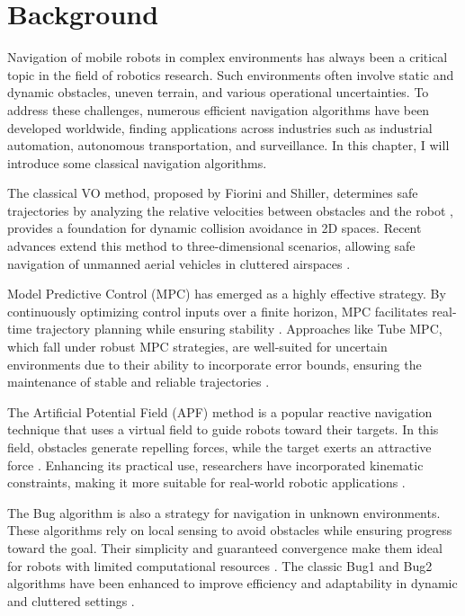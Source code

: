 \chapter{Background}
Navigation of mobile robots in complex environments has always been a critical topic in the field of robotics research. Such environments often involve static and dynamic obstacles, uneven terrain, and various operational uncertainties. To address these challenges, numerous efficient navigation algorithms have been developed worldwide, finding applications across industries such as industrial automation, autonomous transportation, and surveillance. In this chapter, I will introduce some classical navigation algorithms.

The classical VO method, proposed by Fiorini and Shiller, determines safe trajectories by analyzing the relative velocities between obstacles and the robot \cite{Fiorini1998}, provides a foundation for dynamic collision avoidance in 2D spaces. Recent advances extend this method to three-dimensional scenarios, allowing safe navigation of unmanned aerial vehicles in cluttered airspaces \cite{Bareiss2015}.

Model Predictive Control (MPC) has emerged as a highly effective strategy. By continuously optimizing control inputs over a finite horizon, MPC facilitates real-time trajectory planning while ensuring stability \cite{Mayne2014}. Approaches like Tube MPC, which fall under robust MPC strategies, are well-suited for uncertain environments due to their ability to incorporate error bounds, ensuring the maintenance of stable and reliable trajectories \cite{Mayne2014}.

The Artificial Potential Field (APF) method is a popular reactive navigation technique that uses a virtual field to guide robots toward their targets. In this field, obstacles generate repelling forces, while the target exerts an attractive force \cite{Kim2000}. Enhancing its practical use, researchers have incorporated kinematic constraints, making it more suitable for real-world robotic applications \cite{Ge2000}.

The Bug algorithm is also a strategy for navigation in unknown environments. These algorithms rely on local sensing to avoid obstacles while ensuring progress toward the goal. Their simplicity and guaranteed convergence make them ideal for robots with limited computational resources \cite{Lumelsky1991}. The classic Bug1 and Bug2 algorithms have been enhanced to improve efficiency and adaptability in dynamic and cluttered settings \cite{Lumelsky1991}.

